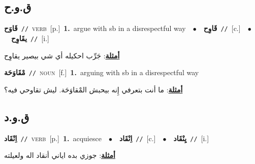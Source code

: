 \documentclass[10pt,a4paper,twoside]{article} %
\begin{document}
\begin{multicols}{2}
\vspace{-3mm}
\subsection*{\color{blue}\foreignlanguage{arabic}{ق.و.ح}\color{blue}{}} 

{\setlength\topsep{0pt}\textbf{\foreignlanguage{arabic}{قَاوَح}}\ {\color{gray}\texttt{//}\color{black}}\ \textsc{verb}\ [p.]\ \textbf{1.}~argue with sb in a disrespectful way\ \ $\bullet$\ \ \setlength\topsep{0pt}\textbf{\foreignlanguage{arabic}{قَاوِح}}\ {\color{gray}\texttt{//}\color{black}}\ [c.]\ \ $\bullet$\ \ \setlength\topsep{0pt}\textbf{\foreignlanguage{arabic}{يقَاوِح}}\ {\color{gray}\texttt{//}\color{black}}\ [i.]\  \begin{flushright}\color{gray}\foreignlanguage{arabic}{\textbf{\underline{\foreignlanguage{arabic}{أمثلة}}}: جَرِّب احكيله أي شي بيصير يقاوِح}\end{flushright}\color{black}} \vspace{2mm}

{\setlength\topsep{0pt}\textbf{\foreignlanguage{arabic}{مْقَاوَحَة}}\ {\color{gray}\texttt{//}\color{black}}\ \textsc{noun}\ [f.]\ \textbf{1.}~arguing with sb in a disrespectful way\  \begin{flushright}\color{gray}\foreignlanguage{arabic}{\textbf{\underline{\foreignlanguage{arabic}{أمثلة}}}: ما أنت بتعرفي إِنه بيحبش المْقاوَحَة. ليش تقاوحي فيه؟}\end{flushright}\color{black}} \vspace{2mm}

\vspace{-3mm}
\subsection*{\color{blue}\foreignlanguage{arabic}{ق.و.د}\color{blue}{}} 

{\setlength\topsep{0pt}\textbf{\foreignlanguage{arabic}{اِنْقَاد}}\ {\color{gray}\texttt{//}\color{black}}\ \textsc{verb}\ [p.]\ \textbf{1.}~acquiesce\ \ $\bullet$\ \ \setlength\topsep{0pt}\textbf{\foreignlanguage{arabic}{اِنْقَاد}}\ {\color{gray}\texttt{//}\color{black}}\ [c.]\ \ $\bullet$\ \ \setlength\topsep{0pt}\textbf{\foreignlanguage{arabic}{يِنْقَاد}}\ {\color{gray}\texttt{//}\color{black}}\ [i.]\  \begin{flushright}\color{gray}\foreignlanguage{arabic}{\textbf{\underline{\foreignlanguage{arabic}{أمثلة}}}: جوزي بده اياني أنقاد اله ولعيلته}\end{flushright}\color{black}} \vspace{2mm}


\end{multicols}
\end{document}
